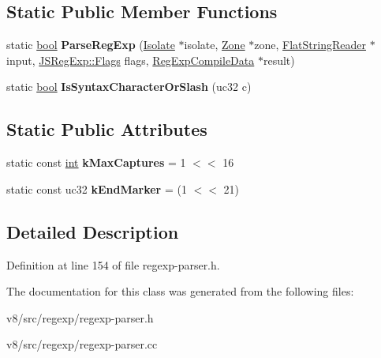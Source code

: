 \subsection*{Static Public Member Functions}
\begin{DoxyCompactItemize}
\item 
\mbox{\label{classv8_1_1internal_1_1RegExpParser_affa89ce678925b57497daba0e75590bf}} 
static \mbox{\hyperlink{classbool}{bool}} {\bfseries Parse\+Reg\+Exp} (\mbox{\hyperlink{classv8_1_1internal_1_1Isolate}{Isolate}} $\ast$isolate, \mbox{\hyperlink{classv8_1_1internal_1_1Zone}{Zone}} $\ast$zone, \mbox{\hyperlink{classv8_1_1internal_1_1FlatStringReader}{Flat\+String\+Reader}} $\ast$input, \mbox{\hyperlink{classv8_1_1base_1_1Flags}{J\+S\+Reg\+Exp\+::\+Flags}} flags, \mbox{\hyperlink{structv8_1_1internal_1_1RegExpCompileData}{Reg\+Exp\+Compile\+Data}} $\ast$result)
\item 
\mbox{\label{classv8_1_1internal_1_1RegExpParser_a71534091fe5b186fd623e457bbec8dcf}} 
static \mbox{\hyperlink{classbool}{bool}} {\bfseries Is\+Syntax\+Character\+Or\+Slash} (uc32 c)
\end{DoxyCompactItemize}
\subsection*{Static Public Attributes}
\begin{DoxyCompactItemize}
\item 
\mbox{\label{classv8_1_1internal_1_1RegExpParser_ae9b789b08eda8b9075851319400fdcb3}} 
static const \mbox{\hyperlink{classint}{int}} {\bfseries k\+Max\+Captures} = 1 $<$$<$ 16
\item 
\mbox{\label{classv8_1_1internal_1_1RegExpParser_a0f116bd0e150ba709dd5877e6981ef09}} 
static const uc32 {\bfseries k\+End\+Marker} = (1 $<$$<$ 21)
\end{DoxyCompactItemize}


\subsection{Detailed Description}


Definition at line 154 of file regexp-\/parser.\+h.



The documentation for this class was generated from the following files\+:\begin{DoxyCompactItemize}
\item 
v8/src/regexp/regexp-\/parser.\+h\item 
v8/src/regexp/regexp-\/parser.\+cc\end{DoxyCompactItemize}
